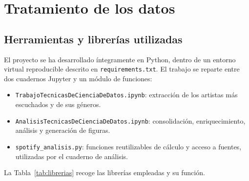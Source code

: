 
\chapter{Tratamiento de los datos}
\label{chap:tratamiento}

\section{Herramientas y librerías utilizadas}
\label{sec:herramientas}

El proyecto se ha desarrollado íntegramente en Python, dentro de un entorno virtual reproducible descrito en \texttt{requirements.txt}. El trabajo se reparte entre dos cuadernos Jupyter y un módulo de funciones:

\begin{itemize}
    \item \texttt{TrabajoTecnicasDeCienciaDeDatos.ipynb}: extracción de los artistas más escuchados y de sus géneros.
    \item \texttt{AnalisisTecnicasDeCienciaDeDatos.ipynb}: consolidación, enriquecimiento, análisis y generación de figuras.
    \item \texttt{spotify\_analisis.py}: funciones reutilizables de cálculo y acceso a fuentes, utilizadas por el cuaderno de análisis.
\end{itemize}

La Tabla~\ref{tab:librerias} recoge las librerías empleadas y su función.

